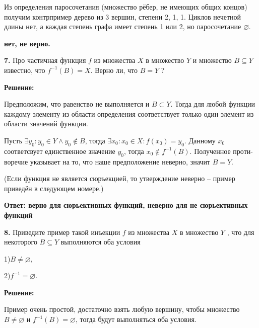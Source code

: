 \documentclass[a4paper,12pt]{article} %
\begin{document}
Из определения паросочетания (множество рёбер, не имеющих общих концов) получим контрпример дерево из 3 вершин, степени 2, 1, 1.
Циклов нечетной длины нет, а каждая степень графа имеет степень 1 или 2, но паросочетание $\varnothing$.



\begin{flushright}
\begin{large}
\textbf {нет, не верно. }
\end{large}
\end{flushright}
\newpage
{\bf 7.} Про частичная функция $f$ из множества $X$ в множество $Y$ и множество $B \subseteq Y$ известно, что $f^{-1}(B) = X$. Верно ли, что $B = Y$ ?
\begin{center}
\bfseries
{\Large Решение: }
\end{center}

Предположим, что равенство не выполняется и $B \subset Y$. Тогда для любой функции каждому элементу из области определения соответствует только один элемент из области значений функции.

Пусть $\exists y_0: y_0 \in Y \wedge y_0 \notin B $, тогда $\exists x_0: x_0 \in X: f(x_0) = y_0$. Данному $x_0$ соответсвует единственное значение $y_0$, тогда $x_0 \notin f^{-1}(B)$. Полученное проти-
воречие указывает на то, что наше предположение неверно, значит $B = Y$.

(Если функция не является сюръекцией, то утверждение неверно -- пример
приведён в следующем номере.)\\


\begin{flushright}
\begin{large}
\textbf {Ответ: верно для сюрьективных функций, неверно для не сюрьективных функций}
\end{large}
\end{flushright}
{\bf 8.} Приведите пример такой инъекции $f$ из множества $X$ в множество
$Y$ , что для некоторого $B \subseteq Y$ выполняются оба условия

1)$B \neq \varnothing$,

2)$f^{-1} = \varnothing$.
\begin{center}
\bfseries
{\Large Решение: }
\end{center}

Пример очень простой, достаточно взять любую вершину, чтобы множество $B \neq \varnothing$ и $f^{-1}(B) = \varnothing$, тогда будут выполняться оба условия.
\end{document}
